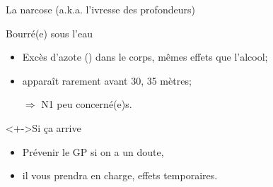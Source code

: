 \begin{frame}{La narcose (a.k.a. l'ivresse des profondeurs)}
\begin{block}{Bourré(e) sous l'eau}
\begin{itemize}[<+->]
\item Excès d'azote () dans le corps, mêmes effets
  que l'alcool;
\item apparaît rarement avant 30, 35 mètres;
\item[$\Rightarrow$] N1 peu concerné(e)s.
\end{itemize}
\end{block}
\begin{exampleblock}<+->{Si ça arrive}
\begin{itemize}[<+->]
\item Prévenir le GP si on a un doute,
\item il vous prendra en charge, effets temporaires.
\end{itemize}
\end{exampleblock}
\end{frame}
